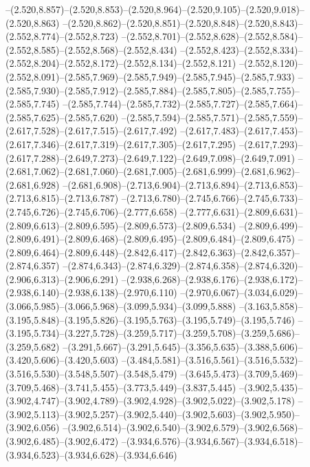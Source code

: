   --(2.520,8.857)--(2.520,8.853)--(2.520,8.964)--(2.520,9.105)--(2.520,9.018)--(2.520,8.863)%
  --(2.520,8.862)--(2.520,8.851)--(2.520,8.848)--(2.520,8.843)--(2.552,8.774)--(2.552,8.723)%
  --(2.552,8.701)--(2.552,8.628)--(2.552,8.584)--(2.552,8.585)--(2.552,8.568)--(2.552,8.434)%
  --(2.552,8.423)--(2.552,8.334)--(2.552,8.204)--(2.552,8.172)--(2.552,8.134)--(2.552,8.121)%
  --(2.552,8.120)--(2.552,8.091)--(2.585,7.969)--(2.585,7.949)--(2.585,7.945)--(2.585,7.933)%
  --(2.585,7.930)--(2.585,7.912)--(2.585,7.884)--(2.585,7.805)--(2.585,7.755)--(2.585,7.745)%
  --(2.585,7.744)--(2.585,7.732)--(2.585,7.727)--(2.585,7.664)--(2.585,7.625)--(2.585,7.620)%
  --(2.585,7.594)--(2.585,7.571)--(2.585,7.559)--(2.617,7.528)--(2.617,7.515)--(2.617,7.492)%
  --(2.617,7.483)--(2.617,7.453)--(2.617,7.346)--(2.617,7.319)--(2.617,7.305)--(2.617,7.295)%
  --(2.617,7.293)--(2.617,7.288)--(2.649,7.273)--(2.649,7.122)--(2.649,7.098)--(2.649,7.091)%
  --(2.681,7.062)--(2.681,7.060)--(2.681,7.005)--(2.681,6.999)--(2.681,6.962)--(2.681,6.928)%
  --(2.681,6.908)--(2.713,6.904)--(2.713,6.894)--(2.713,6.853)--(2.713,6.815)--(2.713,6.787)%
  --(2.713,6.780)--(2.745,6.766)--(2.745,6.733)--(2.745,6.726)--(2.745,6.706)--(2.777,6.658)%
  --(2.777,6.631)--(2.809,6.631)--(2.809,6.613)--(2.809,6.595)--(2.809,6.573)--(2.809,6.534)%
  --(2.809,6.499)--(2.809,6.491)--(2.809,6.468)--(2.809,6.495)--(2.809,6.484)--(2.809,6.475)%
  --(2.809,6.464)--(2.809,6.448)--(2.842,6.417)--(2.842,6.363)--(2.842,6.357)--(2.874,6.357)%
  --(2.874,6.343)--(2.874,6.329)--(2.874,6.358)--(2.874,6.320)--(2.906,6.313)--(2.906,6.291)%
  --(2.938,6.268)--(2.938,6.176)--(2.938,6.172)--(2.938,6.140)--(2.938,6.138)--(2.970,6.110)%
  --(2.970,6.067)--(3.034,6.029)--(3.066,5.985)--(3.066,5.968)--(3.099,5.934)--(3.099,5.888)%
  --(3.163,5.858)--(3.195,5.848)--(3.195,5.826)--(3.195,5.763)--(3.195,5.749)--(3.195,5.746)%
  --(3.195,5.734)--(3.227,5.728)--(3.259,5.717)--(3.259,5.708)--(3.259,5.686)--(3.259,5.682)%
  --(3.291,5.667)--(3.291,5.645)--(3.356,5.635)--(3.388,5.606)--(3.420,5.606)--(3.420,5.603)%
  --(3.484,5.581)--(3.516,5.561)--(3.516,5.532)--(3.516,5.530)--(3.548,5.507)--(3.548,5.479)%
  --(3.645,5.473)--(3.709,5.469)--(3.709,5.468)--(3.741,5.455)--(3.773,5.449)--(3.837,5.445)%
  --(3.902,5.435)--(3.902,4.747)--(3.902,4.789)--(3.902,4.928)--(3.902,5.022)--(3.902,5.178)%
  --(3.902,5.113)--(3.902,5.257)--(3.902,5.440)--(3.902,5.603)--(3.902,5.950)--(3.902,6.056)%
  --(3.902,6.514)--(3.902,6.540)--(3.902,6.579)--(3.902,6.568)--(3.902,6.485)--(3.902,6.472)%
  --(3.934,6.576)--(3.934,6.567)--(3.934,6.518)--(3.934,6.523)--(3.934,6.628)--(3.934,6.646)%
